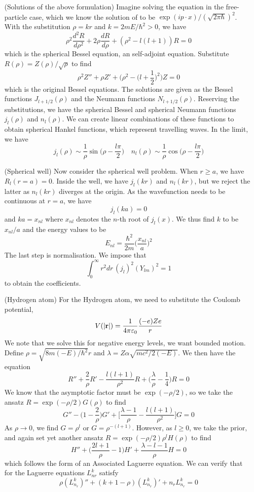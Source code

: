 \begin{rmk}
(Solutions of the above formulation) Imagine solving the equation in the free-particle case, which we know the solution of to be $\exp (ip\cdot x)/(\sqrt{2\pi \hbar })^2$. With the substitution $\rho =kr$ and $k=2mE/\hbar ^2>0$, we have
\[\rho ^2\dfrac{d ^2R}{d \rho ^2}+2\rho \dfrac{d R}{d \rho }+(\rho ^2-l(l+1))R=0  \]
which is the spherical Bessel equation, an self-adjoint equation. Substitute $R(\rho )=Z(\rho )/\sqrt{\rho }$ to find
\[\rho ^2Z''+\rho Z'+\Big(\rho ^2-\Big(l+\dfrac{1}{2}\Big)^2\Big)Z=0\]
which is the original Bessel equations. The solutions are given as the Bessel functions $J_{l+1/2}(\rho )$ and the Neumann functions $N_{l+1/2}(\rho )$. Reserving the substitutions, we have the spherical Bessel and spherical Neumann functions $j_{l}(\rho )$ and $n_{l}(\rho )$. We can create linear combinations of these functions to obtain spherical Hankel functions, which represent travelling waves. In the limit, we have
\[j_{l}(\rho )\sim \dfrac{1}{\rho }\sin \Big(\rho -\dfrac{l\pi }{2}\Big)\quad n_{l}(\rho )\sim \dfrac{1}{\rho }\cos \Big(\rho -\dfrac{l\pi }{2}\Big) \]
\end{rmk}
\vspace{2ex}
\begin{ex}
(Spherical well) Now consider the spherical well problem. When $r\geq a$, we have $R_{l}(r=a)=0$. Inside the well, we have $j_{l}(kr)$ and $n_{l}(kr)$, but we reject the latter as $n_{l}(kr)$ diverges at the origin. As the wavefunction needs to be continuous at $r=a$, we have
\[j_{l}(ka)=0\]
and $ka=x_{nl}$ where $x_{nl}$ denotes the $n$-th root of $j_{l}(x)$. We thus find $k$ to be $x_{nl}/a$ and the energy values to be
\[E_{nl}=\dfrac{\hbar ^2}{2m}\Big(\dfrac{x_{nl}}{a}\Big)^2\]
The last step is normalisation. We impose that
\[\int ^{\infty }_{0}r^2dr\,(j_{l})^2(Y_{lm})^2=1\]
to obtain the coefficients.
\end{ex}
\vspace{2ex}
\begin{ex}
(Hydrogen atom) For the Hydrogen atom, we need to substitute the Coulomb potential, 
\[V(|{\bf r}|)=\dfrac{1}{4\pi \varepsilon_0 }\dfrac{(-e)Ze}{r}\]
We note that we solve this for negative energy levels, we want bounded motion. Define $\rho =\sqrt{8m(-E)/\hbar ^2}r$ and $\lambda =Z\alpha \sqrt{mc^2/2(-E)}$. We then have the equation
\[R''+\dfrac{2}{\rho }R'-\dfrac{l(l+1)}{\rho ^2}R+\Big(\dfrac{\lambda }{\rho }-\dfrac{1}{4}\Big)R=0\]
We know that the asymptotic factor must be $\exp (-\rho /2)$, so we take the ansatz $R=\exp (-\rho /2)G(\rho )$ to find
\[G''-\Big(1-\dfrac{2}{\rho }\Big)G'+\Big[\dfrac{\lambda -1}{\rho }-\dfrac{l(l+1)}{\rho ^2}\Big]G=0\]
As $\rho \rightarrow 0$, we find $G=\rho ^{l}$ or $G=\rho ^{-(l+1)}$. However, as $l\geq 0$, we take the prior, and again set yet another ansatz $R=\exp (-\rho /2)\rho ^{l}H(\rho )$ to find
\[H''+\Big(\dfrac{2l+1}{\rho }-1\Big)H'+\dfrac{\lambda -l-1}{\rho }H=0\]
which follows the form of an Associated Laguerre equation. We can verify that for the Laguerre equations $L^{k}_{nr}$ satisfy
\[\rho (L^{k}_{n_{r}})''+(k+1-\rho )(L^{k}_{n_{r}})'+n_{r}L^{k}_{n_{r}}=0\]

\end{ex}
\vspace{2ex}

